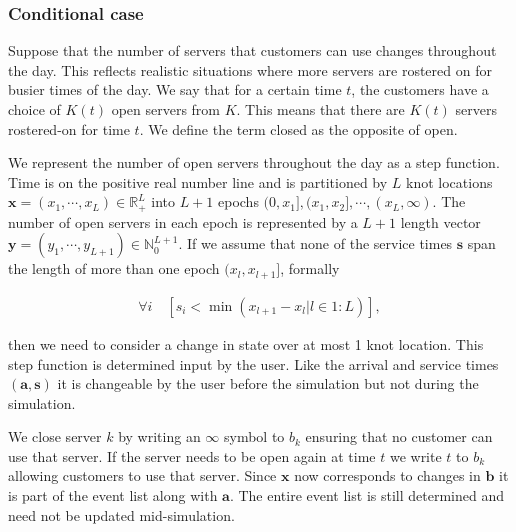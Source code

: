 \documentclass[article]{jss}
\begin{document}
\subsubsection{Conditional case}

Suppose that the number of servers that customers can use changes throughout the day. This reflects realistic situations where more servers are rostered on for busier times of the day. We say that for a certain time $t$, the customers have a choice of $K(t)$ open servers from $K$. This means that there are $K(t)$ servers rostered-on for time $t$. We define the term closed as the opposite of open. 

We represent the number of open servers throughout the day as a step function. Time is on the positive real number line and is partitioned by $L$ knot locations $\mathbf{x} = (x_1, \cdots, x_L ) \in \mathbb{R}^L_{+}$ into $L+1$ epochs $(0, x_1], (x_1, x_2], \cdots, (x_L, \infty)$. The number of open servers in each epoch is represented by a $L+1$ length vector $\mathbf{y} = (y_1, \cdots, y_{L+1} ) \in \mathbb{N}^{L+1}_0$. If we assume that none of the service times $\mathbf{s}$ span the length of more than one epoch $(x_{l}, x_{l+1}]$, formally

\begin{align}
\forall i \quad \left[ s_i < \min({ x_{l+1} - x_{l} | l \in 1:L }) \right] \label{eq:condition},
\end{align}

then we need to consider a change in state over at most 1 knot location. This step function is determined input by the user. Like the arrival and service times $\mathbf{(a,s)}$ it is changeable by the user before the simulation but not during the simulation. 

We close server $k$ by writing an $\infty$ symbol to $b_k$ ensuring that no customer can use that server. If the server needs to be open again at time $t$ we write $t$ to $b_k$ allowing customers to use that server. Since $\mathbf{x}$ now corresponds to changes in $\mathbf{b}$ it is part of the event list along with $\mathbf{a}$. The entire event list is still determined and need not be updated mid-simulation. 
\end{document}
